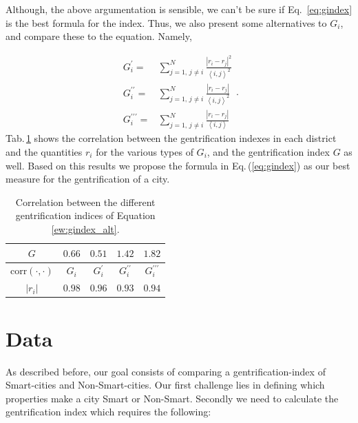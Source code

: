 \documentclass[a4paper, 10pt, conference]{ieeeconf}      %
\providecommand{\tabularnewline}{\\}
\begin{document}
Although, the above argumentation is sensible, we can't be sure if Eq.\ \ref{eq:gindex} is the best formula for the index. Thus, we also present
some alternatives to $G_{i}$, and compare these to the equation. Namely, 

\begin{equation}
\begin{array}{cc}
G_{i}^{\prime}= & \sum_{j=1,\,j\neq i}^{N}\frac{\left|r_{i}-r_{j}\right|^{2}}{\left\langle i,j\right\rangle ^{2}}\\
G_{i}^{\prime\prime}= & \sum_{j=1,\,j\neq i}^{N}\frac{\left|r_{i}-r_{j}\right|}{\left\langle i,j\right\rangle ^{2}}\\
G_{i}^{\prime\prime\prime}= & \sum_{j=1,\,j\neq i}^{N}\frac{\left|r_{i}-r_{j}\right|}{\left\langle i,j\right\rangle }
\end{array}.
\label{eq:gindex_alt}
\end{equation}
Tab.$\,$\ref{tab:Correlation} shows the correlation between the gentrification indexes in each district and the quantities $r_{i}$ for the various types of $G_{i}$, and the gentrification index $G$ as well. Based on this results we propose the formula in Eq.$\,$(\ref{eq:gindex}) as our best measure for the gentrification of a city.

\begin{table}[h]
	\begin{centering}
		\begin{tabular}{|c|c|c|c|c|}
			\hline 
			$G$ & $0.66$ & $0.51$ & $1.42$ & $1.82$\tabularnewline
			\hline 
			\hline 
			$\mathrm{corr}\left(\cdot,\cdot\right)$ & $G_{i}$ & $G_{i}^{\prime}$ & $G_{i}^{\prime\prime}$ & $G_{i}^{\prime\prime\prime}$\tabularnewline
			\hline 
			$\left|r_{i}\right|$ & $0.98$ & $0.96$ & $0.93$ & $0.94$\tabularnewline
			\hline 
		\end{tabular}
		\par\end{centering}
\caption{Correlation between the different gentrification indices of Equation \ref{ew:gindex_alt}.}
\label{tab:Correlation}
\end{table}



\section{Data}
\label{section:Data}
As described before, our goal consists of comparing a gentrification-index of Smart-cities and Non-Smart-cities. 
Our first challenge lies in defining which properties make a city Smart or Non-Smart. Secondly we need to calculate
the gentrification index which requires the following: 
\end{document}
